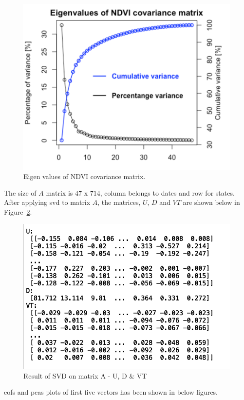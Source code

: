 \begin{figure}[H]
            \centering
            \includegraphics[width=0.70\linewidth]{figures/ch5/SVD/covarianceeigen.png}
            \caption{\label{fig:covriance} Eigen values of NDVI covariance matrix.}
    \end{figure}

The size of $A$ matrix is $47$ x $714$, column belongs to dates and row for states. After applying \gls{svd} to matrix $A$, the matrices, $U$, $D$ and $VT$ are shown below in Figure~\ref{fig:svd_result_matrices}.

    \begin{figure}[H]
            \centering
            \includegraphics[width=0.70\linewidth]{figures/ch5/svd_result_matrix.png}
            \caption{\label{fig:svd_result_matrices} Result of SVD on matrix A - U, D \& VT}
    \end{figure}
    
    \gls{eof}s and \gls{pca}s plots of first five vectors has been shown in below figures.
    
